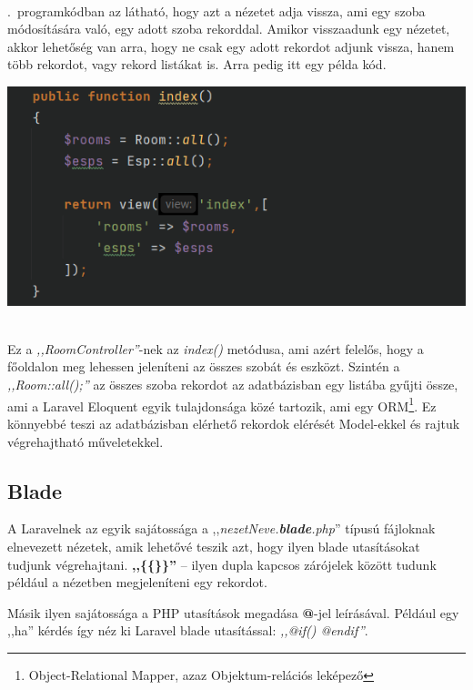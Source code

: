 \documentclass[
]{thesis-ekf}
\theoremstyle{definition}
\theoremstyle{remark}
\begin{document}
	\\
	.~programkódban az látható, hogy azt a nézetet adja vissza, ami egy szoba módosítására való, egy adott szoba rekorddal. Amikor visszaadunk egy nézetet, akkor lehetőség van arra, hogy ne csak egy adott rekordot adjunk vissza, hanem több rekordot, vagy rekord listákat is. Arra pedig itt egy példa kód.\\
	\begin{minipage}{1\linewidth}
		\centering
		\includegraphics[width=1\textwidth]{./src/codes/return_lists}
	\end{minipage}
	\\
	Ez a \emph{,,RoomController''}-nek az \emph{index()} metódusa, ami azért felelős, hogy a főoldalon meg lehessen jeleníteni az összes szobát és eszközt. Szintén a \emph{,,Room::all();''} az összes szoba rekordot az adatbázisban egy listába gyűjti össze, ami a Laravel Eloquent\cite{laravel-eloquent} egyik tulajdonsága közé tartozik, ami egy ORM\footnote{Object-Relational Mapper, azaz Objektum-relációs leképező}. Ez könnyebbé teszi az adatbázisban elérhető rekordok elérését Model-ekkel és rajtuk végrehajtható műveletekkel.
	\subsection{Blade}
	A Laravelnek az egyik sajátossága a ,,\emph{nezetNeve.\textbf{blade}.php}'' típusú fájloknak elnevezett nézetek, amik lehetővé  teszik azt, hogy ilyen blade utasításokat tudjunk végrehajtani. \textbf{,,\{\{\}\}''} -- ilyen dupla kapcsos zárójelek között tudunk például a nézetben megjeleníteni egy rekordot.
	
	Másik ilyen sajátossága a PHP utasítások megadása \textbf{@}-jel leírásával. Például egy ,,ha'' kérdés így néz ki Laravel blade utasítással: \emph{,,@if() @endif''}.\cite{laravel-blade}
	
\end{document}
